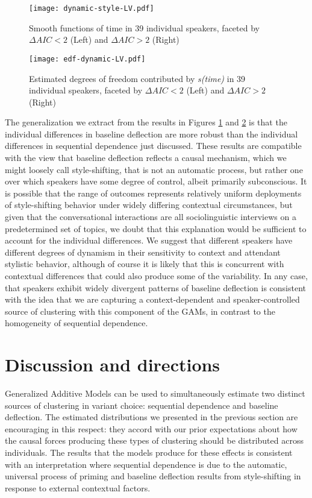 \documentclass[12pt]{article}
\begin{document}
\begin{figure}
    \centering
    \texttt{[image: dynamic-style-LV.pdf]}
    \caption{Smooth functions of time in 39 individual speakers, faceted by $\Delta AIC < 2$ (Left) and $\Delta AIC > 2$ (Right)}
    \label{wiggles}
\end{figure}


\begin{figure}
    \centering
    \texttt{[image: edf-dynamic-LV.pdf]}
    \caption{Estimated degrees of freedom contributed by \emph{s(time)} in 39 individual speakers, faceted by $\Delta AIC < 2$ (Left) and $\Delta AIC > 2$ (Right)}
    \label{colorcurves}
\end{figure}

The generalization we extract from the results in Figures \ref{wiggles} and \ref{colorcurves} is that the individual differences in baseline deflection are more robust than the individual differences in sequential dependence just discussed. 
These results are compatible with the view that baseline deflection reflects a causal mechanism, which we might loosely call  style-shifting, that is not an automatic process, but rather one over which speakers have some degree of control, albeit primarily subconscious. It is possible that the range of outcomes represents relatively uniform deployments of style-shifting behavior under widely differing contextual circumstances, but given that the conversational interactions are all sociolinguistic interviews on a predetermined set of topics, we doubt that this explanation would be sufficient to account for the individual differences. We suggest that different speakers have different degrees of dynamism in their sensitivity to context and attendant stylistic behavior, although of course it is likely that this is concurrent with contextual differences that could also produce some of the variability. In any case, that speakers exhibit widely divergent patterns of baseline deflection is consistent with the idea that we are capturing a context-dependent and speaker-controlled source of clustering with this component of the GAMs, in contrast to the homogeneity of sequential dependence.

\section{Discussion and directions} \label{discussion}

Generalized Additive Models can be used to simultaneously estimate two distinct sources of clustering in variant choice: sequential dependence and baseline deflection. The estimated distributions we presented in the previous section are encouraging in this respect: they accord with our prior expectations about how the causal forces producing these types of clustering should be distributed across individuals. The results that the models produce for these effects is consistent with an interpretation where sequential dependence is due to the automatic, universal process of priming and baseline deflection results from style-shifting in response to external contextual factors.
\end{document}
